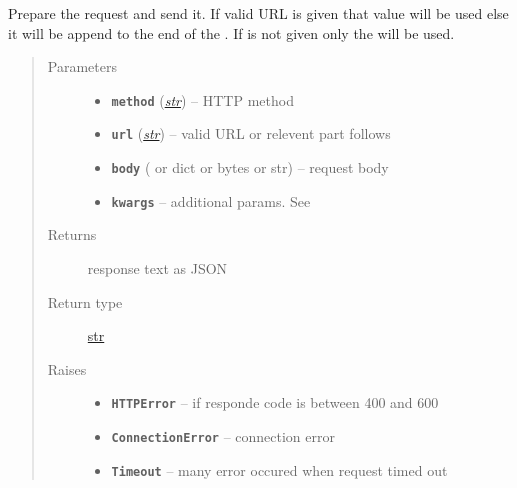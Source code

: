 \documentclass[letterpaper,10pt,english]{sphinxmanual}
\begin{document}
\begin{fulllineitems}

\begin{fulllineitems}
\label{util/adapter:escape.util.adapter.AbstractRESTAdapter._send_request}
Prepare the request and send it. If valid URL is given that value will be
used else it will be append to the end of the . If  is
not given only the  will be used.
\begin{quote}\begin{description}
\item[{Parameters}] \leavevmode\begin{itemize}
\item {} 
\textbf{\texttt{method}} (\href{https://docs.python.org/2.7/library/functions.html\#str}{\emph{str}}) -- HTTP method

\item {} 
\textbf{\texttt{url}} (\href{https://docs.python.org/2.7/library/functions.html\#str}{\emph{str}}) -- valid URL or relevent part follows 

\item {} 
\textbf{\texttt{body}} ({\hyperref[util/nffg:escape.util.nffg.NFFG]{\emph{}}} or dict or bytes or str) -- request body

\item {} 
\textbf{\texttt{kwargs}} -- additional params. See \href{http://docs.python-requests.org/en/latest/api/\#requests.Session.request}{}

\end{itemize}

\item[{Returns}] \leavevmode
response text as JSON

\item[{Return type}] \leavevmode
\href{https://docs.python.org/2.7/library/functions.html\#str}{str}

\item[{Raises}] \leavevmode\begin{itemize}
\item {} 
\textbf{\texttt{HTTPError}} -- if responde code is between 400 and 600

\item {} 
\textbf{\texttt{ConnectionError}} -- connection error

\item {} 
\textbf{\texttt{Timeout}} -- many error occured when request timed out

\end{itemize}

\end{description}\end{quote}

\end{fulllineitems}


\end{fulllineitems}
\end{document}

